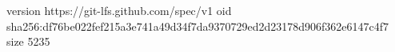 version https://git-lfs.github.com/spec/v1
oid sha256:df76be022fef215a3e741a49d34f7da9370729ed2d23178d906f362e6147c4f7
size 5235
